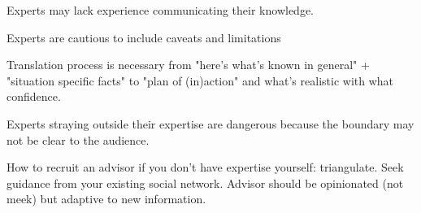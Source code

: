 Experts may lack experience communicating their knowledge. 

Experts are cautious to include caveats and limitations

Translation process is necessary from "here's what's known in general" + "situation specific facts" to "plan of (in)action" and what's realistic with what confidence. 

Experts straying outside their expertise are dangerous because the boundary may not be clear to the audience.



How to recruit an advisor if you don't have expertise yourself: triangulate. Seek guidance from your existing social network. Advisor should be opinionated (not meek) but adaptive to new information. 